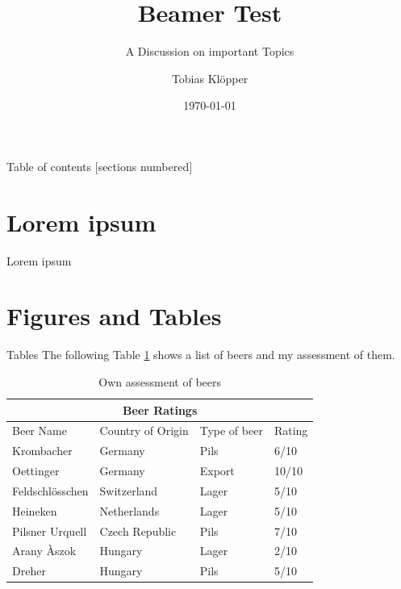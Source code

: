 \documentclass[10pt]{beamer}
\title{Beamer Test}
\subtitle{A Discussion on important Topics}
\date{\today}
\author{Tobias Klöpper}
\institute{Institute for Brewing and Degustation}
\begin{document}
\maketitle

\begin{frame}{Table of contents}
  [sections numbered]
  \tableofcontents%
\end{frame}

\section{Lorem ipsum}
\begin{frame}{Lorem ipsum}
\blindtext
\end{frame}

\section{Figures and Tables}
\begin{frame}{Tables}
The following Table \ref{table:1} shows a list of beers and my assessment of them.
\begin{table}[h!]
\begin{tabular}{ |p{3cm}||p{3cm}|p{2cm}|p{1cm}|  }
 \hline
 \multicolumn{4}{|c|}{Beer Ratings} \\
 \hline
 Beer Name & Country of Origin &Type of beer&Rating\\
 \hline
 Krombacher   & Germany    & Pils &   6/10\\
 Oettinger&   Germany  & Export   &10/10\\
 Feldschlösschen &Switzerland & Lager &  5/10\\
 Heineken    &Netherlands & Lager &  5/10\\
 Pilsner Urquell&   Czech Republic  & Pils & 7/10\\
 Arany Àszok& Hungary  & Lager   & 2/10\\
 Dreher& Hungary  & Pils & 5/10\\
 \hline
 \end{tabular}
 \caption{Own assessment of beers}
 \label{table:1}
\end{table}
\end{frame}
\end{document}
